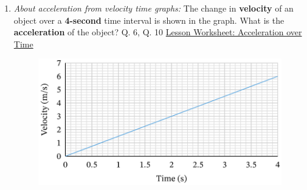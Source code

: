 \documentclass[A4,12pt]{article}
\begin{document}
\begin{enumerate}[label=\bfseries (\arabic*)]
\item {\it About acceleration from velocity time graphs:} The change in \textbf{velocity} of an object over a \textbf{4-second} time interval is shown in the graph. What is the \textbf{acceleration} of the object? \cite{Nagwa} Q. 6, Q. 10 \href{https://www.nagwa.com/en/worksheets/684146965834/}{Lesson Worksheet: Acceleration over Time}
%
\begin{figure}[H]
    \centering
    \includegraphics{Nagwa_Q6_acel.png}
\end{figure}
%

















\end{enumerate}
\end{document}
